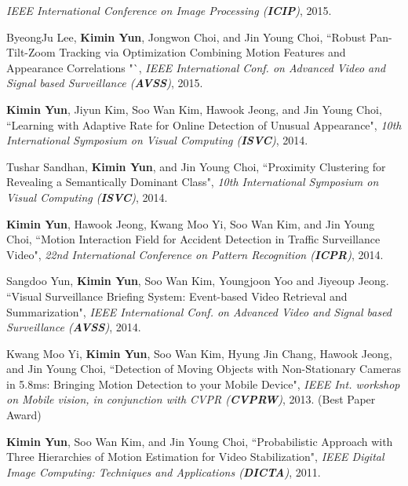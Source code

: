 \documentclass[10pt]{article}
\makeatletter
\newlength{\bibhang}
\newlength{\bibsep}
 {\@listi \global\bibsep\itemsep \global\advance\bibsep by\parsep}
\newenvironment{bibsection}%
        {\vspace{-\baselineskip}\begin{list}{}{%
       \setlength{\leftmargin}{\bibhang}%
       \setlength{\itemindent}{-\leftmargin}%
       \setlength{\itemsep}{\bibsep}%
       \setlength{\parsep}{\z@}%
        \setlength{\partopsep}{0pt}%
        \setlength{\topsep}{0pt}}}
        {\end{list}\vspace{-.6\baselineskip}}
\makeatother
\begin{document}
\begin{bibsection}
				 \emph{IEEE International Conference on Image Processing (\textbf{ICIP})}, 2015.
		\item ByeongJu Lee, \textbf{Kimin Yun}, Jongwon Choi, and Jin Young Choi,
				``Robust Pan-Tilt-Zoom Tracking via Optimization Combining Motion Features and Appearance Correlations "`,
				 \emph{IEEE International Conf. on Advanced Video and Signal based Surveillance (\textbf{AVSS})}, 2015.  
		\item \textbf{Kimin Yun}, Jiyun Kim, Soo Wan Kim, Hawook Jeong, and Jin Young Choi,
				``Learning with Adaptive Rate for Online Detection of Unusual Appearance",
				\emph{10th International Symposium on Visual Computing (\textbf{ISVC})}, 2014.
		\item  Tushar Sandhan, \textbf{Kimin Yun}, and Jin Young Choi,
				``Proximity Clustering for Revealing a Semantically Dominant Class",
				\emph{10th International Symposium on Visual Computing (\textbf{ISVC})}, 2014.
		\item \textbf{Kimin Yun}, Hawook Jeong, Kwang Moo Yi, Soo Wan Kim, and Jin Young Choi,
				``Motion Interaction Field for Accident Detection in Traffic Surveillance Video",
				\emph{22nd International Conference on Pattern Recognition (\textbf{ICPR})}, 2014.
        \item  Sangdoo Yun, \textbf{Kimin Yun}, Soo Wan Kim, Youngjoon Yoo and Jiyeoup Jeong.
              ``Visual Surveillance Briefing System: Event-based Video Retrieval and Summarization",
              \emph{IEEE International Conf. on Advanced Video and Signal based Surveillance (\textbf{AVSS})}, 2014.
		\item Kwang Moo Yi, \textbf{Kimin Yun}, Soo Wan Kim, Hyung Jin Chang, Hawook Jeong, and Jin Young Choi,
				``Detection of Moving Objects with Non-Stationary Cameras in 5.8ms: Bringing Motion Detection to your Mobile Device",
				\emph{IEEE Int. workshop on Mobile vision, in conjunction with CVPR  (\textbf{CVPRW})}, 2013. (Best Paper Award)
		\item \textbf{Kimin Yun}, Soo Wan Kim, and Jin Young Choi,
				``Probabilistic Approach with Three Hierarchies of Motion Estimation for Video Stabilization",
				\emph{IEEE Digital Image Computing: Techniques and Applications (\textbf{DICTA})}, 2011.
				



\end{bibsection}
\end{document}

